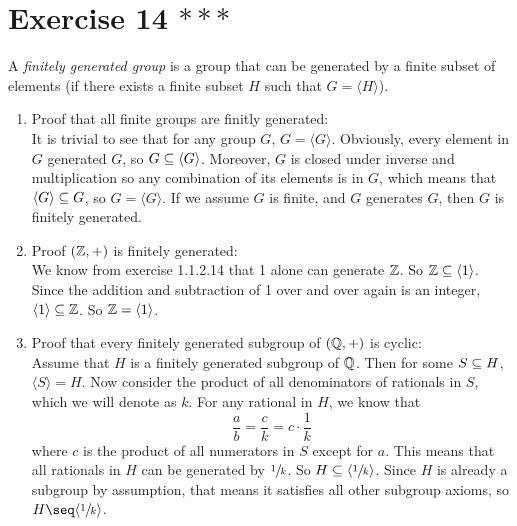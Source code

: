 \documentclass[12pt]{article}
\begin{document}
    \section*{Exercise 14 $***$}
    A \textit{finitely generated group} is a group that can be generated
    by a finite subset of elements
    (if there exists a finite subset $H$ such that $G = \langle H \rangle$).
    \begin{enumerate}[label=\textbf{\alph*.}]
        \item 
            Proof that all finite groups are finitly generated: \\
            It is trivial to see that for any group $G$,
            $G = \langle G \rangle$.
            Obviously, every element in $G$ generated $G$,
            so $G \subseteq \langle G \rangle$.
            Moreover, $G$ is closed under inverse and multiplication
            so any combination of its elements is in $G$,
            which means that $\langle G \rangle \subseteq G$,
            so $G = \langle G \rangle$.
            If we assume $G$ is finite,
            and $G$ generates $G$,
            then $G$ is finitely generated.
        \item 
            Proof $(\mathbb{Z}, +)$ is finitely generated: \\
            We know from exercise 1.1.2.14 that 1 alone can generate $\mathbb{Z}$.
            So $\mathbb{Z} \subseteq \langle 1 \rangle$.
            Since the addition and subtraction of 1 over and over again
            is an integer,
            $\langle 1 \rangle \subseteq \mathbb{Z}$.
            So $\mathbb{Z} = \langle 1 \rangle$.
        \item
            Proof that every finitely generated subgroup of $(\mathbb{Q}, +)$
            is cyclic: \\
            Assume that $H$ is a finitely generated subgroup of $\mathbb{Q}$.
            Then for some $S \subseteq H$,
            $\langle S \rangle = H$.
            Now consider the product of all denominators of rationals in $S$,
            which we will denote as $k$.
            For any rational in $H$,
            we know that 
            \[ \dfrac{a}{b} = \dfrac{c}{k} = c \cdot \dfrac{1}{k} \]
            where $c$ is the product of all numerators in $S$
            except for $a$.
            This means that all rationals in $H$
            can be generated by $\sfrac{1}{k}$.
            So $H \subseteq \langle \sfrac{1}{k} \rangle$.
            Since $H$ is already a subgroup by assumption,
            that means it satisfies all other subgroup axioms,
            so $H \seq \langle \sfrac{1}{k} \rangle$.

\end{enumerate}
\end{document}
